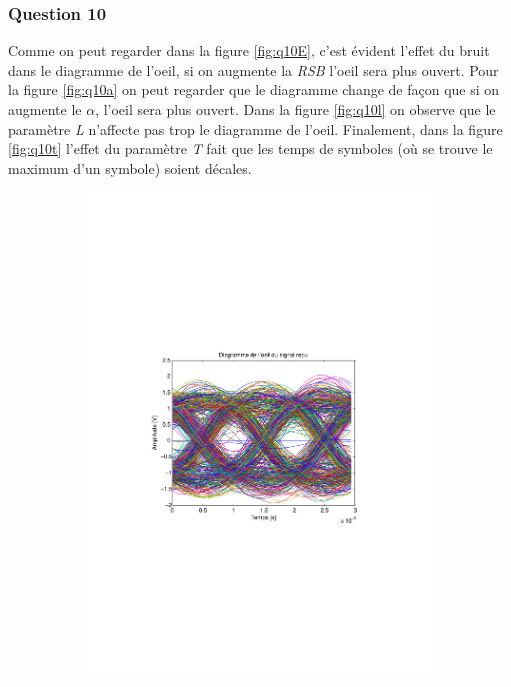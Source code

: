 \documentclass[a4paper,11pt]{article}
\begin{document}
\subsubsection*{Question 10}
Comme on peut regarder dans la figure \ref{fig:q10E}, c'est évident l'effet du bruit dans le diagramme de l'oeil, si on augmente la \emph{RSB} l'oeil sera plus ouvert. Pour la figure \ref{fig:q10a} on peut regarder que le diagramme change de façon que si on augmente le $\alpha$, l'oeil sera plus ouvert. Dans la figure \ref{fig:q10l} on observe que le paramètre \emph{L} n'affecte pas trop le diagramme de l'oeil. Finalement, dans la figure \ref{fig:q10t} l'effet du paramètre \emph{T} fait que les temps de symboles (où se trouve le maximum d'un symbole) soient décales.
\begin{figure}
	\begin{subfigure}{.5\textwidth}
  		\centering
  		\includegraphics[width=1\linewidth]{Q10-EbNo10.pdf}

\end{subfigure}
\end{figure}
\end{document}
